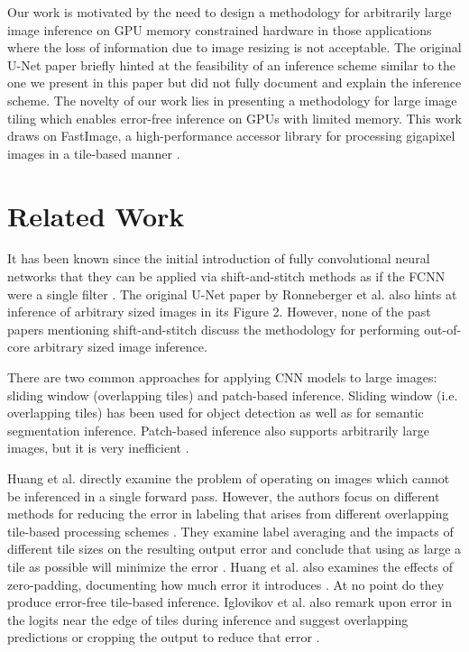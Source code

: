 \documentclass[letterpaper]{article} %
\begin{document}
Our work is motivated by the need to design a methodology for arbitrarily large image inference on GPU memory constrained hardware in those applications where the loss of information due to image resizing is not acceptable. The original U-Net paper \cite{Ronneberger2015a} briefly hinted at the feasibility of an inference scheme similar to the one we present in this paper but did not fully document and explain the inference scheme. 
The novelty of our work lies in presenting a methodology for large image tiling which enables error-free inference on GPUs with limited memory. This work draws on FastImage, a high-performance accessor library for processing gigapixel images in a tile-based manner \cite{Bardakoff2019}.

\section{Related Work}
\label{related-work}

It has been known since the initial introduction of fully convolutional neural networks that they can be applied via shift-and-stitch methods as if the FCNN were a single filter \cite{Long2015,Sherrah2016}.
The original U-Net paper by Ronneberger et al. \cite{Ronneberger2015a} also hints at inference of arbitrary sized images in its Figure 2. However, none of the past papers mentioning shift-and-stitch discuss the methodology for performing out-of-core arbitrary sized image inference.

There are two common approaches for applying CNN models to large images: sliding window (overlapping tiles) and patch-based inference. Sliding window (i.e. overlapping tiles) has been used for object detection \cite{Sermanet2013,VanEtten2019} as well as for semantic segmentation \cite{Lin2019,Volpi2017a} inference. Patch-based inference also supports arbitrarily large images, but it is very inefficient \cite{Volpi2017a,Maggiori2016}.

Huang et al. directly examine the problem of operating on images which cannot be inferenced in a single forward pass. However, the authors focus on different methods for reducing the error in labeling that arises from different overlapping tile-based processing schemes \cite{Huang2019a}. They examine label averaging and the impacts of different tile sizes on the resulting output error and conclude that using as large a tile as possible will minimize the error \cite{Huang2019a}. Huang et al. also examines the effects of zero-padding, documenting how much error it introduces \cite{Huang2019a}. At no point do they produce error-free tile-based inference. Iglovikov et al. also remark upon error in the logits near the edge of tiles during inference and suggest overlapping predictions or cropping the output to reduce that error \cite{Iglovikov2017}. 
\end{document}
